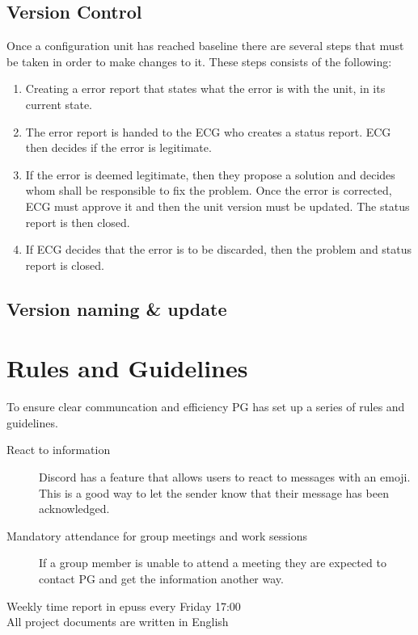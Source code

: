 \documentclass{article}
\begin{document}
    \subsection{Version Control \label{versioncontrol}}
        Once a configuration unit has reached baseline there are several steps
        that must be taken in order to make changes to it.
        These steps consists of the following:
        \begin{enumerate}
            \item Creating a error report that states what the
                    error is with the unit, in its current state.
            \item The error report is handed to the ECG who creates a 
                    status report. ECG then decides if the error is legitimate.
            \item If the error is deemed legitimate, then they
                    propose a solution and
                    decides whom shall be responsible to fix the problem.
                    Once the error is corrected, ECG must approve it
                    and then the unit version must be updated.
                    The status report is then closed.
            \item If ECG decides that the error is to be discarded, then
                    the problem and status report is closed.
                
        \end{enumerate}

    \subsection{Version naming \& update}
        
        
    


\section{Rules and Guidelines} %
    To ensure clear communcation and efficiency PG has set up a series of rules and guidelines. 
    
    \begin{description}
        \item[React to information] Discord has a feature that allows users to react to messages with an emoji. This is a good way to let the sender know that their message has been acknowledged.
        \item[Mandatory attendance for group meetings and work sessions] If a group member is unable to attend a meeting they are expected to contact PG and get the information another way.  
        \item[Weekly time report in epuss every Friday 17:00]
        \item[All project documents are written in English]
        \item[ ]
    \end{description}
    
\end{document}
